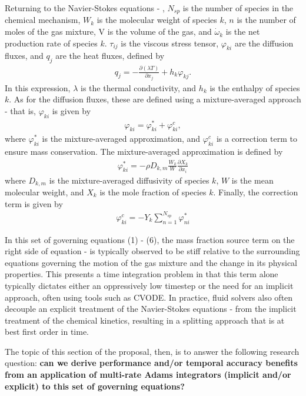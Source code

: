 Returning to the Navier-Stokes equations  - , $N_{sp}$ is the number of species
in the chemical mechanism, $W_{k}$ is the molecular weight of species $k$, $n$ is the number of moles of the gas
mixture, V is the volume of the gas, and $\dot{\omega}_{k}$ is the net production rate of species $k$. $\tau_{ij}$
is the viscous stress tensor, $\varphi_{ki}$ are the diffusion fluxes, and $q_{j}$ are the heat fluxes, defined by
\begin{align}
q_{j} = - \frac{\partial (\lambda T)}{\partial x_{j}} + h_{k}\varphi_{kj}.
\end{align}
In this expression, $\lambda$ is the thermal conductivity, and $h_{k}$ is the enthalpy of species $k$.
As for the diffusion fluxes, these are defined using a mixture-averaged approach - that is, $\varphi_{ki}$
is given by
\begin{align}
\varphi_{ki} = \varphi_{ki}^{*} + \varphi_{ki}^{c},
\end{align}
where $\varphi_{ki}^{*}$ is the mixture-averaged approximation, and $\varphi_{ki}^{c}$
is a correction term to ensure mass conservation. The mixture-averaged approximation
is defined by
\begin{align}
\varphi_{ki}^{*} = -\rho D_{k,m}\frac{W_{k}}{W} \frac{\partial X_{k}}{\partial x_{i}}
\end{align}
where $D_{k,m}$ is the mixture-averaged diffusivity of species $k$, $W$ is the mean
molecular weight, and $X_{k}$ is the mole fraction of species $k$. Finally, the
correction term is given by
\begin{align}
\varphi_{ki}^{c} = -Y_{k} \sum_{n=1}^{N_{sp}} \varphi_{ni}^{*}
\end{align}

In this set of governing equations (1) - (6), the mass fraction source term
on the right side of equation  -  is typically observed
to be stiff relative to the surrounding equations governing the motion of the gas mixture
and the change in its physical properties. This presents a time integration problem in
that this term alone typically dictates either an oppressively low timestep or the need for
an implicit approach, often using tools such as CVODE. In practice, fluid solvers
also often decouple an explicit treatment of the Navier-Stokes equations  - 
from the implicit treatment of the chemical kinetics, resulting in a splitting
approach that is at best first order in time.

The topic of this section of the proposal, then, is to answer the following
research question: \textbf{can we derive performance and/or temporal accuracy benefits
from an application of multi-rate Adams integrators (implicit and/or explicit) to this
set of governing equations?}

